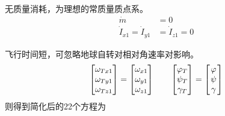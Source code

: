 \noa[3] 无质量消耗，为理想的常质量质点系。
\begin{align}
	\dot{m} &= 0 \\
	\dot{I}_{x1} = \dot{I}_{y1} &= \dot{I}_{z1} = 0
\end{align}

\noa[4] 飞行时间短，可忽略地球自转对相对角速率对影响。
\begin{equation}
	\begin{bmatrix}
		\omega_{Tx1} \\
		\omega_{Ty1}\\
		\omega_{Tz1}
	\end{bmatrix}
	=
	\begin{bmatrix}
		\omega_{x1} \\
		\omega_{y1} \\
		\omega_{z1}
	\end{bmatrix}
	\qquad 
	\begin{bmatrix}
		\varphi_T \\
		\psi_T \\
		\gamma_T
	\end{bmatrix}
	=
	\begin{bmatrix}
		\hspace*{0.1em}\varphi \hspace*{0.1em}\\
		\hspace*{0.1em}\psi \hspace*{0.1em}\\
		\hspace*{0.1em}\gamma \hspace*{0.1em}
	\end{bmatrix}
\end{equation}
则得到简化后的22个方程为
